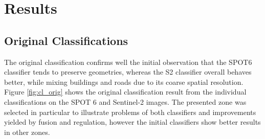 \documentclass[10pt]{article}
\begin{document}
\section{Results}
\subsection{Original Classifications}
The original classification confirms well the initial observation that the SPOT6 classifier tends to preserve geometries, whereas the S2 classifier overall behaves better, while mixing buildings and roads due to its coarse spatial resolution. Figure \ref{fig:cl_orig} shows the original classification result from the individual classifications on the SPOT 6 and Sentinel-2 images. The presented zone was selected in particular to illustrate problems of both classifiers and improvements yielded by fusion and regulation, however the initial classifiers show better results in other zones.\\ %
\end{document}
